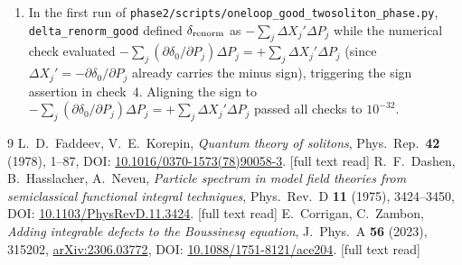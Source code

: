 \documentclass[11pt,a4paper]{article}
\newcommand{\script}[1]{\texttt{phase2/\allowbreak scripts/\allowbreak #1}}
\theoremstyle{remark}
\begin{document}
\begin{enumerate}
\item In the first run of \script{oneloop\_good\_twosoliton\_phase.py}, \texttt{delta\_renorm\_good} defined $\delta_{\rm renorm}$ as $-\sum_j\Delta X_j'\Delta P_j$ while the numerical check evaluated $-\sum_j(\partial\delta_0/\partial P_j)\Delta P_j=+\sum_j\Delta X_j'\Delta P_j$ (since $\Delta X_j'=-\partial\delta_0/\partial P_j$ already carries the minus sign), triggering the sign assertion in check~4. Aligning the sign to $-\sum_j(\partial\delta_0/\partial P_j)\Delta P_j=+\sum_j\Delta X_j'\Delta P_j$ passed all checks to $10^{-32}$.
\end{enumerate}

\begin{thebibliography}{9}\small
{} L.~D.~Faddeev, V.~E.~Korepin, \emph{Quantum theory of solitons}, Phys.\ Rep.\ \textbf{42} (1978), 1--87, DOI: \href{https://doi.org/10.1016/0370-1573(78)90058-3}{10.1016/0370-1573(78)90058-3}. [full text read]
 R.~F.~Dashen, B.~Hasslacher, A.~Neveu, \emph{Particle spectrum in model field theories from semiclassical functional integral techniques}, Phys.\ Rev.\ D \textbf{11} (1975), 3424--3450, DOI: \href{https://doi.org/10.1103/PhysRevD.11.3424}{10.1103/PhysRevD.11.3424}. [full text read]
 E.~Corrigan, C.~Zambon, \emph{Adding integrable defects to the Boussinesq equation}, J.\ Phys.\ A \textbf{56} (2023), 315202, \href{https://arxiv.org/abs/2306.03772}{arXiv:2306.03772}, DOI: \href{https://doi.org/10.1088/1751-8121/ace204}{10.1088/1751-8121/ace204}. [full text read]
\end{thebibliography}
\end{document}
